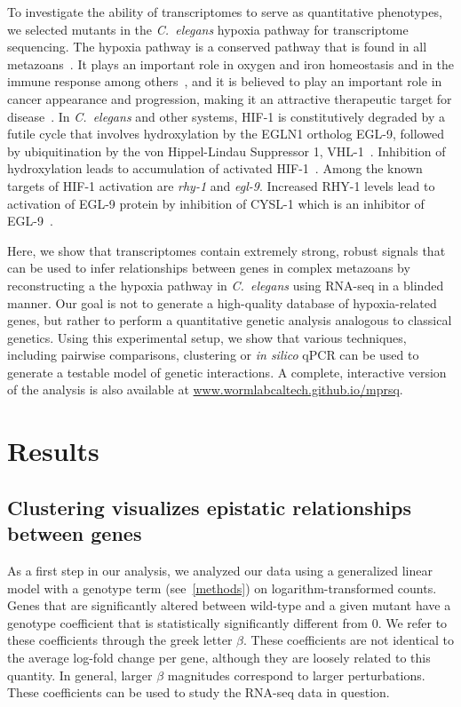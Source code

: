 \documentclass[9pt,twocolumn,twoside]{pnas-new}
\newcommand{\cel}{\emph{C.~elegans}}
\newcommand{\egl}{\emph{egl-9}}
\newcommand{\rhy}{\emph{rhy-1}}
\newcommand{\eglp}{EGL-9}
\newcommand{\rhyp}{RHY-1}
\newcommand{\vhlp}{VHL-1}
\newcommand{\hifp}{HIF-1}
\begin{document}
To investigate the ability of transcriptomes to serve as quantitative phenotypes, we selected mutants in the \cel{} hypoxia pathway for transcriptome sequencing. The hypoxia pathway is a conserved pathway that is found in all metazoans~\cite{Semenza2012}. It plays an important role in oxygen and iron homeostasis and in the immune response among others~\cite{Nizet2009,Ackerman2012}, and it is believed to play an important role in cancer appearance and progression, making it an attractive therapeutic target for disease~\cite{Semenza2003}.
 In \cel{} and other systems, \hifp{} is constitutively degraded by a futile cycle that involves hydroxylation by the EGLN1 ortholog \eglp{}, followed by ubiquitination by the von Hippel-Lindau Suppressor 1, \vhlp{}~\cite{Bishop2004,Shao2009,Tanimoto2000,Jaakkola2001}. Inhibition of hydroxylation leads to accumulation of activated \hifp{}~\cite{Bishop2004}. Among the known targets of \hifp{} activation are \rhy{} and \egl{}. Increased \rhyp{} levels lead to activation of \eglp{} protein by inhibition of CYSL-1 which is an inhibitor of \eglp{}~\cite{Shen2006,Ma2012}.

Here, we show that transcriptomes contain extremely strong, robust signals that can be used to infer relationships between genes in complex metazoans by reconstructing a the hypoxia pathway in \cel{} using RNA-seq in a blinded manner. Our goal is not to generate a high-quality database of hypoxia-related genes, but rather to perform a quantitative genetic analysis analogous to classical genetics. Using this experimental setup, we show that various techniques, including pairwise comparisons, clustering or \emph{in silico} qPCR can be used to generate a testable model of genetic interactions. A complete, interactive version of the analysis is also available at \url{www.wormlabcaltech.github.io/mprsq}.

\section*{Results}
\subsection{Clustering visualizes epistatic relationships between genes}
\label{sub:Clustering}

As a first step in our analysis, we analyzed our data using a generalized linear model with a genotype term (see~\ref{methods}) on logarithm-transformed counts. Genes that are significantly altered between wild-type and a given mutant have a genotype coefficient that is statistically significantly different from 0. We refer to these coefficients through the greek letter $\beta$. These coefficients are not identical to the average log-fold change per gene, although they are loosely related to this quantity. In general, larger $\beta$ magnitudes correspond to larger perturbations. These coefficients can be used to study the RNA-seq data in question.
\end{document}
